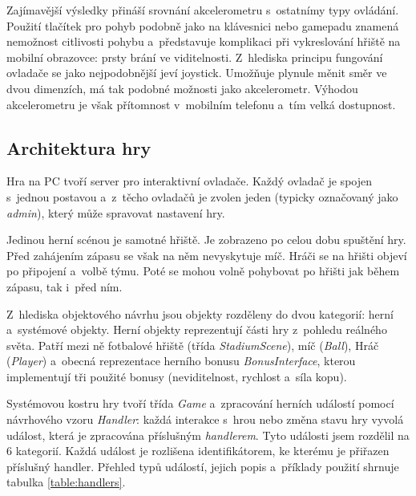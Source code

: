 \documentclass[thesis=B,czech,hidelinks]{FITthesis}[2012/06/26] %
\begin{document}
Zajímavější výsledky přináší srovnání akcelerometru s~ostatnímy typy ovládání. Použití tlačítek pro pohyb podobně jako na klávesnici nebo gamepadu znamená nemožnost citlivosti pohybu a~představuje komplikaci při vykreslování hřiště na mobilní obrazovce: prsty brání ve viditelnosti. Z~hlediska principu fungování ovladače se jako nejpodobnější jeví joystick. Umožňuje plynule měnit směr ve dvou dimenzích, má tak podobné možnosti jako akcelerometr. Výhodou akcelerometru je však přítomnost v~mobilním telefonu a~tím velká dostupnost.

\subsection{Architektura hry}

Hra na PC tvoří server pro interaktivní ovladače. Každý ovladač je spojen s~jednou postavou a~z~těcho ovladačů je zvolen jeden (typicky označovaný jako \textit{admin}), který může spravovat nastavení hry.

Jedinou herní scénou je samotné hřiště. Je zobrazeno po celou dobu spuštění hry. Před zahájením zápasu se však na něm nevyskytuje míč. Hráči se na hřišti objeví po připojení a~volbě týmu. Poté se mohou volně pohybovat po hřišti jak během zápasu, tak i~před ním. 

Z~hlediska objektového návrhu jsou objekty rozděleny do dvou kategorií: herní a~systémové objekty. Herní objekty reprezentují části hry z~pohledu reálného světa. Patří mezi ně fotbalové hřiště (třída \textit{StadiumScene}), míč (\textit{Ball}), Hráč (\textit{Player}) a~obecná reprezentace herního bonusu \textit{BonusInterface}, kterou implementují tři použité bonusy (neviditelnost, rychlost a~síla kopu). 

Systémovou kostru hry tvoří třída \textit{Game} a~zpracování herních událostí pomocí návrhového vzoru \textit{Handler}\cite{patterns}: každá interakce s~hrou nebo změna stavu hry vyvolá událost, která je zpracována příslušným \textit{handlerem}. Tyto události jsem rozdělil na 6 kategorií. Každá událost je rozlišena identifikátorem, ke kterému je přiřazen příslušný handler. Přehled typů událostí, jejich popis a~příklady použití shrnuje tabulka \ref{table:handlers}.
\end{document}
